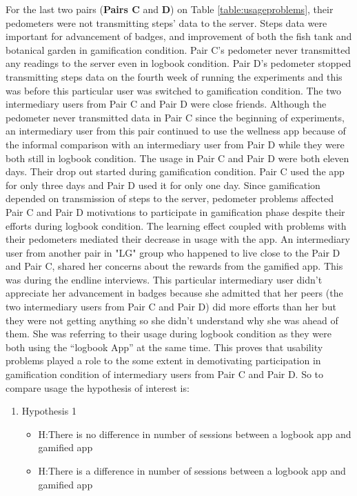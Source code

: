 For the last two pairs (\textbf{Pairs C} and \textbf{D}) on Table \ref{table:usageproblems}, their pedometers were not transmitting steps' data to the server. Steps data were important for advancement of badges, and improvement of both the fish tank and botanical garden in gamification condition. Pair C's pedometer never transmitted any readings to the server even in logbook condition.  Pair D's pedometer stopped transmitting steps data on the fourth week of running the experiments and this was before this particular user was switched to gamification condition. The two intermediary users from Pair C and Pair D were close friends. Although the pedometer never transmitted data in Pair C  since the beginning of experiments, an intermediary user from this pair continued to use the wellness app because of the informal comparison with an intermediary user from Pair D while they were both still in logbook condition. The usage in Pair C and Pair D were both eleven days. Their drop out started during gamification condition. Pair C used the app for only three days and Pair D used it for only one day. Since gamification depended on transmission of steps to the server, pedometer problems affected Pair C and Pair D motivations to participate in gamification phase despite their efforts during logbook condition. The learning effect coupled with problems with their pedometers mediated their decrease in usage with the app.  An intermediary user from another pair in "LG" group who happened to live close to the Pair D and Pair C, shared her concerns about the rewards from the gamified app. This was during the endline interviews. This particular intermediary user didn't appreciate her advancement in badges because she admitted that her peers (the two intermediary users from Pair C and Pair D) did more efforts than her but they were not getting anything so she didn't understand why she was ahead of them. She was referring to their usage during logbook condition as they were both using the ``logbook App'' at the same time.  This proves that usability problems played a role to the some extent in demotivating participation in gamification condition  of intermediary users from Pair C and Pair D. So to compare usage the hypothesis of interest is:

\begin{enumerate}
\item{Hypothesis 1}
\begin{itemize}
\item{H}:There is no difference in number of sessions between a logbook app and gamified app
\item{H}:There is a difference in number of sessions between a logbook app and gamified app
\end{itemize}
\end{enumerate}
